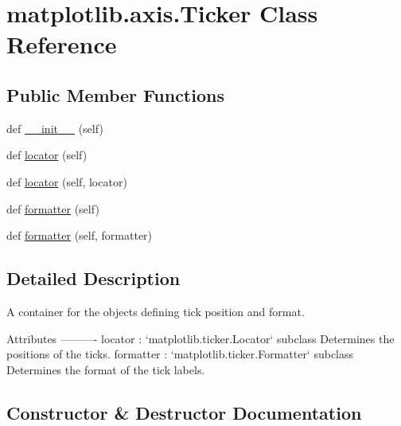 \hypertarget{classmatplotlib_1_1axis_1_1Ticker}{}\section{matplotlib.\+axis.\+Ticker Class Reference}
\label{classmatplotlib_1_1axis_1_1Ticker}
\subsection*{Public Member Functions}
\begin{DoxyCompactItemize}
\item 
def \hyperlink{classmatplotlib_1_1axis_1_1Ticker_a63c41e22a1c449ee80f4d3bb071783c7}{\+\_\+\+\_\+init\+\_\+\+\_\+} (self)
\item 
def \hyperlink{classmatplotlib_1_1axis_1_1Ticker_a1914202bdb293e5816128241834736e0}{locator} (self)
\item 
def \hyperlink{classmatplotlib_1_1axis_1_1Ticker_a26dabd3c190a96ca2e50c41929cf2b1d}{locator} (self, locator)
\item 
def \hyperlink{classmatplotlib_1_1axis_1_1Ticker_ac2df43f52c4599169043c779f9c6deed}{formatter} (self)
\item 
def \hyperlink{classmatplotlib_1_1axis_1_1Ticker_ac08cb5f3463a4f230bbd56a3323e872b}{formatter} (self, formatter)
\end{DoxyCompactItemize}


\subsection{Detailed Description}
\begin{DoxyVerb}A container for the objects defining tick position and format.

Attributes
----------
locator : `matplotlib.ticker.Locator` subclass
    Determines the positions of the ticks.
formatter : `matplotlib.ticker.Formatter` subclass
    Determines the format of the tick labels.
\end{DoxyVerb}
 

\subsection{Constructor \& Destructor Documentation}
\mbox{\label{classmatplotlib_1_1axis_1_1Ticker_a63c41e22a1c449ee80f4d3bb071783c7}} 

